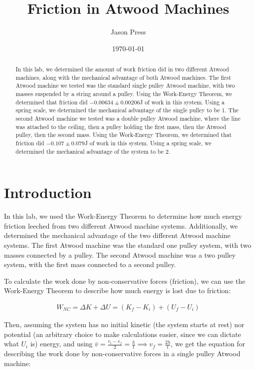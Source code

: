 \documentclass[12pt]{article}
\author{Jason Press}
\date{\today}
\title{Friction in Atwood Machines}
\begin{document}
\maketitle
\begin{abstract}


In this lab, we determined the amount of work friction did in two different Atwood machines, along with the mechanical advantage of both Atwood machines. The first Atwood machine we tested was the standard single pulley Atwood machine, with two masses suspended by a string around a pulley. Using the Work-Energy Theorem, we determined that friction did \(-0.00634 \pm 0.00206\)J of work in this system. Using a spring scale, we determined the mechanical advantage of the single pulley to be 1. The second Atwood machine we tested was a double pulley Atwood machine, where the line was attached to the ceiling, then a pulley holding the first mass, then the Atwood pulley, then the second mass. Using the Work-Energy Theorem, we determined that friction did \(-0.107 \pm 0.079\)J of work in this system. Using a spring scale, we determined the mechanical advantage of the system to be 2.
\end{abstract}
\section{Introduction}
\label{sec:org6f9b124}

In this lab, we used the Work-Energy Theorem to determine how much energy friction leeched from two different Atwood machine systems. Additionally, we determined the mechanical advantage of the two different Atwood machine systems. The first Atwood machine was the standard one pulley system, with two masses connected by a pulley. The second Atwood machine was a two pulley system, with the first mass connected to a second pulley.

To calculate the work done by non-conservative forces (friction), we can use the Work-Energy Theorem to describe how much energy is lost due to friction:

\begin{align*}
W_{NC} = \Delta K + \Delta U = (K_f - K_i) + (U_f - U_i)
\end{align*}

Then, assuming the system has no initial kinetic (the system starts at rest) nor potential (an arbitrary choice to make calculations easier, since we can dictate what \(U_i\) is) energy, and using \(\bar{v} = \frac{v_i - v_{f}}{2} = \frac{h}{t} \implies v_f = \frac{2h}{t}\), we get the equation for describing the work done by non-conservative forces in a single pulley Atwood machine:
\end{document}
